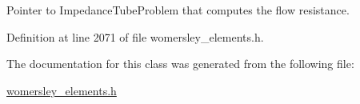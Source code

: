 Pointer to Impedance\+Tube\+Problem that computes the flow resistance. 



Definition at line 2071 of file womersley\+\_\+elements.\+h.



The documentation for this class was generated from the following file\+:\begin{DoxyCompactItemize}
\item 
\hyperlink{womersley__elements_8h}{womersley\+\_\+elements.\+h}\end{DoxyCompactItemize}

